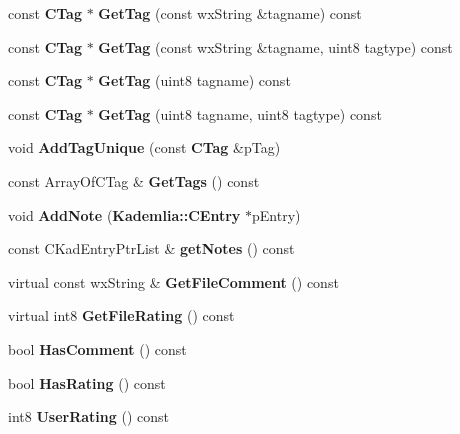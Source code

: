 \begin{DoxyCompactItemize}
\item 
const {\bf CTag} $\ast$ {\bfseries GetTag} (const wxString \&tagname) const \label{classCAbstractFile_a26d6c728ee7c01fa49ed4aba70f3c5a0}

\item 
const {\bf CTag} $\ast$ {\bfseries GetTag} (const wxString \&tagname, uint8 tagtype) const \label{classCAbstractFile_a90fd9b7aa94441089cc6e7cf05d97085}

\item 
const {\bf CTag} $\ast$ {\bfseries GetTag} (uint8 tagname) const \label{classCAbstractFile_ae28e3879266e0b31251fc79ec1d390c9}

\item 
const {\bf CTag} $\ast$ {\bfseries GetTag} (uint8 tagname, uint8 tagtype) const \label{classCAbstractFile_ada8c255300680a581ee8f3c89d68fc53}

\item 
void {\bfseries AddTagUnique} (const {\bf CTag} \&pTag)\label{classCAbstractFile_a970506374f1b3d4c5a17db49dc8138ad}

\item 
const ArrayOfCTag \& {\bfseries GetTags} () const \label{classCAbstractFile_a8f119531ecc8a3221c4f64dce259a944}

\item 
void {\bfseries AddNote} ({\bf Kademlia::CEntry} $\ast$pEntry)\label{classCAbstractFile_ab5d88b479ac6046825c523838a4e6297}

\item 
const CKadEntryPtrList \& {\bfseries getNotes} () const \label{classCAbstractFile_aff8444b5fd9d52c85a9a27c6c3360b52}

\item 
virtual const wxString \& {\bfseries GetFileComment} () const \label{classCAbstractFile_a553b1d83db494a5a10ad772212e8b957}

\item 
virtual int8 {\bfseries GetFileRating} () const \label{classCAbstractFile_a343226fe26d5fcc6100e42a2e4cb3429}

\item 
bool {\bfseries HasComment} () const \label{classCAbstractFile_aa0be8a007dcddd9dfa0072806a281ffa}

\item 
bool {\bfseries HasRating} () const \label{classCAbstractFile_a5aaa3a34e8c7f9ca64afe4aecb75e10e}

\item 
int8 {\bfseries UserRating} () const \label{classCAbstractFile_aadac1f2f0911bb7854d40630811211a4}

\end{DoxyCompactItemize}
